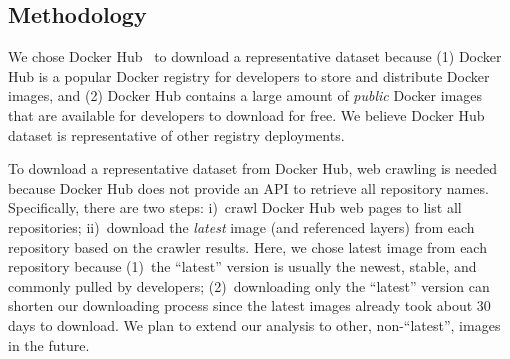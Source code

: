 \subsection{Methodology}
\label{sec:methodology}



%
%

We chose Docker Hub~\cite{docker-hub} to download a representative dataset
because (1) Docker Hub is a popular Docker registry for developers to store and
distribute Docker images, and (2) Docker Hub contains a large amount of
\emph{public} Docker images that are available for developers to download for
free.
%
We believe Docker Hub dataset is representative of other registry deployments.

To download a representative dataset from Docker Hub, web crawling is needed
because Docker Hub does not provide an API to retrieve all repository names.
%
Specifically, there are two steps: i)~crawl Docker Hub web pages to list all
repositories; ii)~download the \textit{latest} image (and referenced layers)
from each repository based on the crawler results.
%
Here, we chose latest image from each repository because (1)~the ``latest''
version is usually the newest, stable, and commonly pulled by developers;
(2)~downloading only the ``latest'' version can shorten our downloading process
since the latest images already took about 30 days to download.
%
We plan to extend our analysis to other, non-``latest'', images in the future.

%


